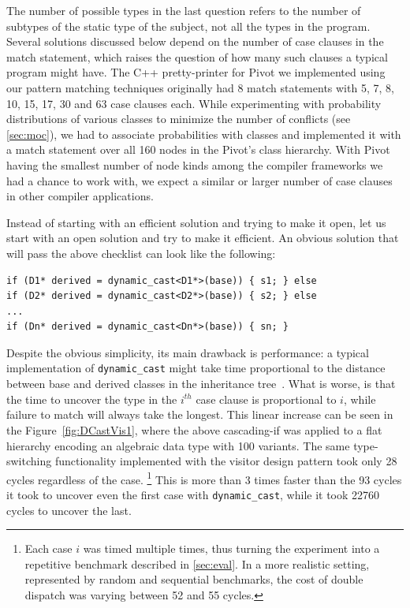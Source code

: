 \documentclass[preprint]{sigplanconf}
\makeatletter
\DeclareRobustCommand{\code}[1]{{\lstinline[breaklines=false,escapechar=@]{#1}}}
\makeatother
\begin{document}
The number of possible types in the last question refers to the number of subtypes 
of the static type of the subject, not all the types in the program. Several 
solutions discussed below depend on the number of case clauses in the match 
statement, which raises the question of how many such clauses a typical program 
might have. The C++ pretty-printer for Pivot we implemented using our pattern 
matching techniques originally had 8 match statements with 5, 7, 8, 10, 15, 17, 30 
and 63 case clauses each. While experimenting 
with probability distributions of various classes to minimize the number of 
conflicts (see \textsection\ref{sec:moc}), we had to associate probabilities 
with classes and implemented it with a match statement over all 160 nodes in the 
Pivot's class hierarchy. With Pivot having the smallest number of node kinds 
among the compiler frameworks we had a chance to work with, we expect a similar 
or larger number of case clauses in other compiler applications.

Instead of starting with an efficient solution and trying to make it open, let us 
start with an open solution and try to make it efficient. 
An obvious solution that will pass the above checklist can look like the following:

\begin{lstlisting}
if (D1* derived = dynamic_cast<D1*>(base)) { s1; } else
if (D2* derived = dynamic_cast<D2*>(base)) { s2; } else
...
if (Dn* derived = dynamic_cast<Dn*>(base)) { sn; }
\end{lstlisting}

\noindent
Despite the obvious simplicity, its main drawback is performance: a typical 
implementation of \code{dynamic_cast} might take time proportional to the 
distance between base and derived classes in the inheritance tree~\cite{XXXXX}.
What is worse, is that the time to uncover the type in the $i^{th}$ case clause 
is proportional to $i$, while failure to match will always take the longest. 
This linear increase can be seen in the Figure~\ref{fig:DCastVis1}, where 
the above cascading-if was applied to a flat hierarchy encoding an algebraic 
data type with 100 variants. The same type-switching functionality implemented 
with the visitor design pattern took only 28 cycles regardless of the case.
\footnote{Each case $i$ was timed multiple times, thus turning the experiment 
into a repetitive benchmark described in \textsection\ref{sec:eval}. In a more
realistic setting, represented by random and sequential benchmarks, the cost of 
double dispatch was varying between 52 and 55 cycles.}
This is more than 3 times faster than the 93 cycles it took to uncover even the 
first case with \code{dynamic_cast}, while it took 22760 cycles to uncover the 
last.
\end{document}
